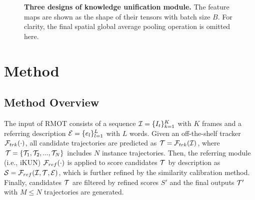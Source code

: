 \documentclass[10pt,twocolumn,letterpaper]{article}
\begin{document}
\begin{figure}
    \centering
    \caption{
        \textbf{Three designs of knowledge unification module.}
        The feature maps are shown as the shape of their tensors with batch size $B$.
        For clarity, the final spatial global average pooling operation is omitted here.
    }
    \label{fig_4}
\end{figure}

\section{Method}
\subsection{Method Overview}
    The input of RMOT consists of a sequence ${\cal I} = \{I_t\}_{k=1}^K$ with $K$ frames and a referring description ${\cal E} = \{e_l\}_{l=1}^L$ with $L$ words.
    Given an off-the-shelf tracker ${\cal F}_{trk}(\cdot)$, all candidate trajectories are predicted as ${\cal T} = {\cal F}_{trk}(\cal I)$,
    where ${\cal T} = \{ {\cal T}_1, {\cal T}_2, ..., {\cal T}_N\}$ includes $N$ instance trajectories. 
    Then, the referring module (i.e., iKUN) ${\cal F}_{ref}(\cdot)$ is applied to score candidates $\cal T$ by description as ${\cal S} = {\cal F}_{ref}(\cal I, T, E)$,
    which is further refined by the similarity calibration method.
    Finally, candidates ${\cal T}$ are filtered by refined scores $S'$ and the final outputs ${\cal T}'$ with $M \le N$ trajectories are generated.
\end{document}
